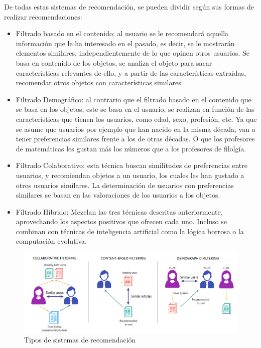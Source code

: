 De todas estas sistemas de recomendación, se pueden dividir según sus formas de realizar recomendaciones:

\begin{itemize}
    \item Filtrado basado en el contenido\cite{filtradocontenido}: al usuario se le recomendará aquella información que le ha interesado en el pasado, es decir, se le mostrarán elementos similares, independientemente de lo que opinen otros usuarios. 
    Se basa en contenido de los objetos, se analiza el objeto para sacar características relevantes de ello, y a partir de las características 
    extraídas, recomendar otros objetos con características similares.   
    \item Filtrado Demográfico\cite{filtrademografico}: al contrario que el filtrado basado en el contenido que se basa en los objetos, este se basa en el usuario,
    se realizan en función de las características que tienen los usuarios, como edad, sexo, profesión, etc. Ya que se asume que usuarios por ejemplo 
    que han nacido en la misma década, van a tener preferencias similares frente a los de otras décadas. O que los profesores de matemáticas les gustan más los números 
    que a los profesores de filolgía. 
    \item Filtrado Colaborativo\cite{filtradocolaborativo}: esta técnica buscan similitudes de preferencias entre usuarios, y recomiendan objetos a un usuario, 
    los cuales les han gustado a otros usuarios similares. La determinación de usuarios con preferencias similares se basan en 
    las valoraciones de los usuarios a los objetos.
    \item Filtrado Híbrido\cite{filtrahibrido}: Mezclan las tres técnicas descritas anteriormente, aprovechando los aspectos positivos
    que ofrecen cada uno. Incluso se combinan con técnicas de inteligencia artificial como la lógica borrosa o la computación evolutiva. 
\end{itemize} 

\begin{figure}[H]
    \centering
    \includegraphics[width=6in, angle=0]{figures/chapter-2/recommendation_systems.png}
    \caption{Tipos de sistemas de recomendación \cite{imagefilters}}
\end{figure}

